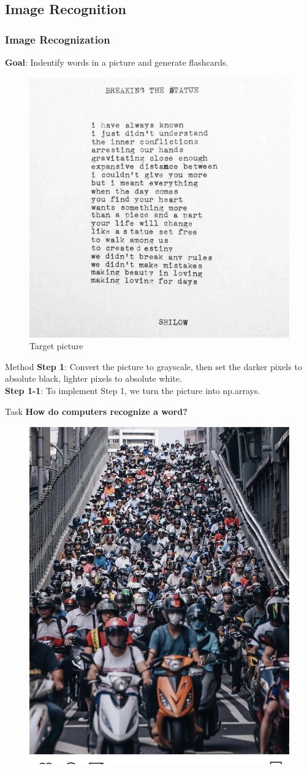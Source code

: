 \documentclass{beamer}
\begin{document}
\subsection{Image Recognition}%
\label{sub:image_recognition}



\begin{frame}
	\frametitle{Image Recognization}
	\textbf{Goal}: Indentify words in a picture and generate flashcards.
	\begin{figure}[h]
		\centering
		\includegraphics[width=0.55\linewidth]{./img1.jpg}
		\caption{Target picture}
	\end{figure}
\end{frame}

\begin{frame}{Method}
		\textbf{Step 1}: Convert the picture to grayscale, then set the darker pixels to absolute black, lighter pixels to absolute white.\\
		\textbf{Step 1-1}: To implement Step 1, we turn the picture into np.arrays.
\end{frame}

\begin{frame}{Task}
		\textbf{How do computers recognize a word?}
		\begin{figure}[h]
			\centering
			\includegraphics[width=0.55\linewidth]{./motor.jpg}
		\end{figure}
\end{frame}
\end{document}
